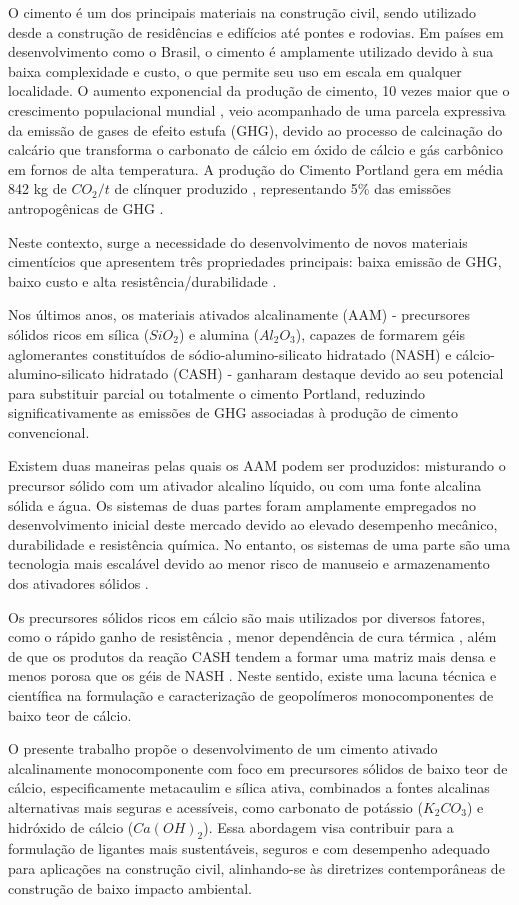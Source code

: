 O cimento é um dos principais materiais na construção civil, sendo utilizado desde a construção de residências e edifícios até pontes e rodovias.
Em países em desenvolvimento como o Brasil, o cimento é amplamente utilizado devido à sua baixa complexidade e custo, o que permite seu uso em escala em qualquer localidade.
O aumento exponencial da produção de cimento, 10 vezes maior que o crescimento populacional mundial \cite{united1995world}, veio acompanhado de uma parcela expressiva da emissão de gases de efeito estufa (GHG), devido ao processo de calcinação do calcário que transforma o carbonato de cálcio em óxido de cálcio e gás carbônico em fornos de alta temperatura.
A produção do Cimento Portland gera em média 842 kg de $CO_2/t$ de clínquer produzido \cite{andrew2018global}, representando 5\% das emissões antropogênicas de GHG \cite{IEA_WBCSD_2009}.

Neste contexto, surge a necessidade do desenvolvimento de novos materiais cimentícios que apresentem três propriedades principais: baixa emissão de GHG, baixo custo e alta resistência/durabilidade \cite{scrivener2018eco}.

Nos últimos anos, os materiais ativados alcalinamente (AAM) - precursores sólidos ricos em sílica ($SiO_2$) e alumina ($Al_2O_3$), capazes de formarem géis aglomerantes constituídos de sódio-alumino-silicato hidratado (NASH) e cálcio-alumino-silicato hidratado (CASH) - ganharam destaque devido ao seu potencial para substituir parcial ou totalmente o cimento Portland, reduzindo significativamente as emissões de GHG associadas à produção de cimento convencional.

Existem duas maneiras pelas quais os AAM podem ser produzidos: misturando o precursor sólido com um ativador alcalino líquido, ou com uma fonte alcalina sólida e água.
Os sistemas de duas partes foram amplamente empregados no desenvolvimento inicial deste mercado devido ao elevado desempenho mecânico, durabilidade e resistência química.
No entanto, os sistemas de uma parte são uma tecnologia mais escalável devido ao menor risco de manuseio e armazenamento dos ativadores sólidos \cite{provis2018alkali}.

Os precursores sólidos ricos em cálcio são mais utilizados por diversos fatores, como o rápido ganho de resistência \cite{provis2014geopolymers}, menor dependência de cura térmica \cite{ke2021one}, além de que os produtos da reação CASH tendem a formar uma matriz mais densa e menos porosa que os géis de NASH \cite{bernal2014engineering}.
Neste sentido, existe uma lacuna técnica e científica na formulação e caracterização de geopolímeros monocomponentes de baixo teor de cálcio.

O presente trabalho propõe o desenvolvimento de um cimento ativado alcalinamente monocomponente com foco em precursores sólidos de baixo teor de cálcio, especificamente metacaulim e sílica ativa, combinados a fontes alcalinas alternativas mais seguras e acessíveis, como carbonato de potássio ($K_2CO_3$) e hidróxido de cálcio ($Ca(OH)_2$).
Essa abordagem visa contribuir para a formulação de ligantes mais sustentáveis, seguros e com desempenho adequado para aplicações na construção civil, alinhando-se às diretrizes contemporâneas de construção de baixo impacto ambiental.